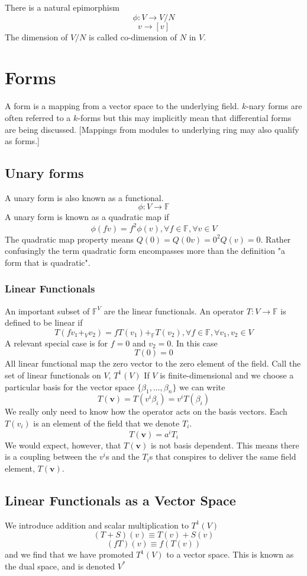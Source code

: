 \documentclass[a4paper]{scrartcl}
\begin{document}
There is a natural epimorphism $$\phi:V\rightarrow V/N$$
$$v\rightarrow[v]$$
The dimension of $V/N$ is called co-dimension of $N$ in $V$.

\section{Forms}
A form is a mapping from a vector space to the underlying field.  $k$-nary forms are often referred to a $k$-forms but this may implicitly mean that differential forms are being discussed. [Mappings from modules to underlying ring may also qualify as forms.]
\subsection{Unary forms}
A unary form is also known as a functional.
$$\phi\colon V \rightarrow \mathbb{F}$$
A unary form is known as a quadratic map if
$$\phi(fv) = f^2 \phi(v), \forall f\in\mathbb{F}, \forall v\in V$$
The quadratic map property means $Q(0) = Q(0v) = 0^2Q(v) = 0$. Rather confusingly the term quadratic form encompasses more than the definition "a form that is quadratic".


\subsubsection{Linear Functionals}
An important subset of $\mathbb{F}^{V}$ are the linear functionals. An operator $T\colon V\rightarrow \mathbb{F}$ is defined to be linear if
$$T(f v_{1} +_{V} v_{2}) = f T(v_{1}) +_{\mathbb{F}} T(v_{2}), \forall f\in \mathbb{F},  \forall v_{1},v_{2}\in V$$
A relevant special case is for $f = 0$ and $v_{2} = 0$. In this case
$$T(0) = 0$$
All linear functional map the zero vector to the zero element of the field. Call the set of linear functionals on $V$, $T^{1}(V)$
If $V$ is finite-dimensional and we choose a particular basis for the vector space $\{\beta_{1}, \ldots, \beta_{n}\}$ we can write
$$T(\boldsymbol{v}) = T(v^{i}\beta_{i}) = v^{i}T(\beta_{i})$$
We really only need to know how the operator acts on the basis vectors. Each $T(v_{i})$ is an element of the field that we denote $T_{i}$. 
$$T(\boldsymbol{v}) = a^{i}T_{i}$$
We would expect, however, that $T(\boldsymbol{v})$ is not basis dependent. This means there is a coupling between the $v^{i}$s and the $T_{i}$s that conspires to deliver the same field element, $T(\boldsymbol{v})$.

\subsection{Linear Functionals as a Vector Space}
We introduce addition and scalar multiplication to $T^{1}(V)$
$$(T+S)(v) \equiv T(v) + S(v)$$
$$(fT)(v) \equiv f(T(v))$$
and we find that we have promoted $T^{1}(V)$ to a vector space. This is known as the dual space, and is denoted $V^{\ast}$
\end{document}
